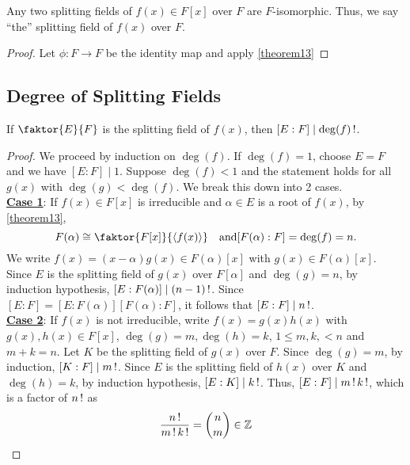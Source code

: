 \documentclass[11pt]{article}
\newcommand{\cyclic}[1]{\left\langle #1 \right\rangle}
\newcommand{\quotient}[2]{\faktor{#1}{#2}}
\begin{document}
\begin{corollary}\label{corollary14}
Any two splitting fields of $f(x) \in F[x]$ over $F$ are $F$-isomorphic. Thus,
we say ``the'' splitting field of $f(x)$ over $F$.
\end{corollary}
\begin{proof}
Let $\phi:F \to F$ be the identity map and apply \cref{theorem13}
\end{proof}

\subsection{Degree of Splitting Fields}

\begin{theorem}
If $\quotient{E}{F}$ is the splitting field of $f(x)$, then $[E:F] \mid
\deg(f)\operatorname{!}$.
\label{theorem14}
\end{theorem}
\begin{proof}
We proceed by induction on $\deg(f)$. If $\deg(f) = 1$, choose $E = F$ and we
have $[E:F] \mid 1$. Suppose $\deg(f) < 1$ and the statement holds for all
$g(x)$ with $\deg(g) < \deg(f)$. We break this down into 2 cases.\\
\underline{\bf Case 1}: If $f(x) \in F[x]$ is irreducible and $\alpha \in E$ is
a root of $f(x)$, by \cref{theorem13},
\begin{equation*}
F(\alpha) \cong \quotient{F[x]}{\cyclic{f(x)}} \quad \text{and} [F(\alpha):F] =
\deg(f) = n.
\end{equation*}
We write $f(x) = (x-\alpha)g(x) \in F(\alpha)[x]$ with $g(x) \in
F(\alpha)[x]$. Since $E$ is the splitting field of $g(x)$ over $F[\alpha]$ and
$\deg(g) = n$, by induction hypothesis, $[E:F(\alpha)] \mid (n-1)\operatorname{!}$. Since
$[E:F] = [E:F(\alpha)][F(\alpha):F]$, it follows that $[E:F] \mid n\operatorname{!}$.\\
\underline{\bf Case 2}: If $f(x)$ is not irreducible, write $f(x) = g(x)h(x)$
with $g(x),h(x) \in F[x]$, $\deg(g)=m, \deg(h) = k$, $1 \leq m,k, < n$ and
$m + k = n$. Let $K$ be the splitting field of $g(x)$ over $F$. Since $\deg(g) =
m$, by induction, $[K:F] \mid m\operatorname{!}$. Since $E$ is the splitting field of
$h(x)$ over $K$ and $\deg(h) = k$, by induction hypothesis, $[E:K] \mid k\operatorname{!}$.
Thus, $[E:F] \mid m\operatorname{!} k\operatorname{!}$, which is a factor of $n\operatorname{!}$ as
\begin{equation*}
\frac{n\operatorname{!}}{m \operatorname{!} k\operatorname{!}} = \binom{n}{m} \in \mathbb{Z}
\end{equation*}
\end{proof}
\end{document}
